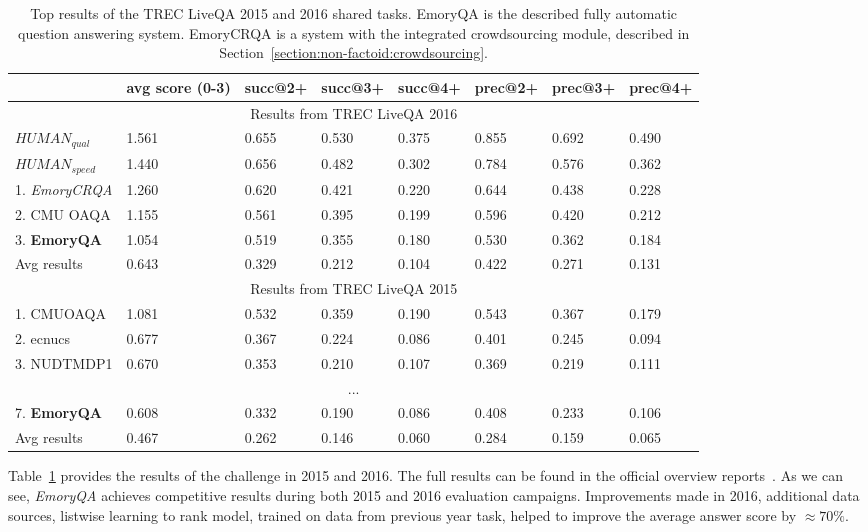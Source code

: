 \begin{table}[t]
\centering
\footnotesize
\begin{tabular}[t]
{p{2.5cm}|p{0.8cm}p{1.2cm}p{1.2cm}p{1.2cm}p{1.2cm}p{1.2cm}p{1.2cm}}
& avg score (0-3) & succ@2+ & succ@3+ & succ@4+ & prec@2+ &  prec@3+ & prec@4+ \\
\hline
\multicolumn{8}{c}{Results from TREC LiveQA 2016} \\
\hline
$HUMAN_{qual}$ & 1.561 & 0.655 & 0.530 & 0.375 & 0.855 & 0.692 & 0.490\\
$HUMAN_{speed}$ & 1.440 & 0.656 & 0.482 & 0.302 & 0.784 & 0.576 & 0.362\\
\hline
1. \textit{EmoryCRQA} & 1.260 & 0.620 & 0.421 & 0.220 & 0.644 & 0.438 & 0.228 \\
2. CMU OAQA & 1.155 & 0.561 & 0.395 & 0.199 & 0.596 & 0.420 & 0.212 \\
3. \textbf{EmoryQA} & 1.054 & 0.519 & 0.355 & 0.180 & 0.530 & 0.362 & 0.184 \\
\hline
Avg results & 0.643 & 0.329 & 0.212 & 0.104 & 0.422 & 0.271 & 0.131 \\
\hline
\multicolumn{8}{c}{Results from TREC LiveQA 2015} \\
\hline
1. CMUOAQA &  1.081 & 0.532 & 0.359 & 0.190 & 0.543 & 0.367 & 0.179 \\
2. ecnucs &  0.677 & 0.367 & 0.224 & 0.086 & 0.401 & 0.245 & 0.094\\
3. NUDTMDP1 &  0.670 & 0.353 & 0.210 & 0.107 & 0.369 & 0.219 & 0.111\\
\hline
\multicolumn{8}{c}{...} \\
\hline
7. \textbf{EmoryQA} & 0.608 & 0.332 & 0.190 & 0.086 & 0.408 & 0.233 & 0.106\\
\hline
Avg results & 0.467 & 0.262 & 0.146 & 0.060 & 0.284 & 0.159 & 0.065\\
\end{tabular}
\caption{Top results of the TREC LiveQA 2015 and 2016 shared tasks. EmoryQA is the described fully automatic question answering system. EmoryCRQA is a system with the integrated crowdsourcing module, described in Section~\ref{section:non-factoid:crowdsourcing}.}
\label{table:non-factoid:system:results}
\end{table}

Table~\ref{table:non-factoid:system:results} provides the results of the challenge in 2015 and 2016.
The full results can be found in the official overview reports~\cite{overviewliveqa15,overviewliveqa16}.
As we can see, \textit{EmoryQA} achieves competitive results during both 2015 and 2016 evaluation campaigns.
Improvements made in 2016, \ie additional data sources, listwise learning to rank model, trained on data from previous year task, helped to improve the average answer score by $\approx 70\%$.

